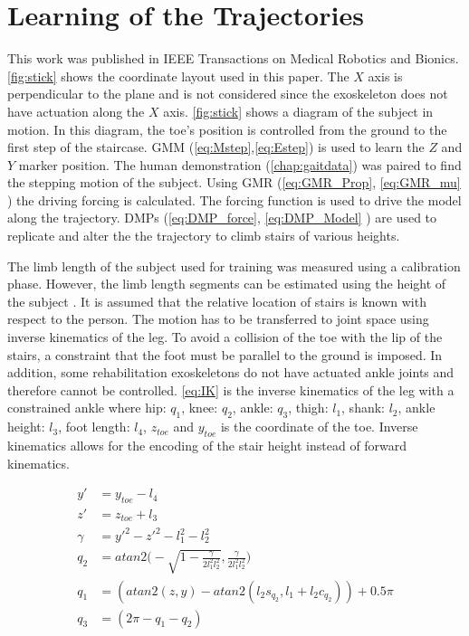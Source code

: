 \section{Learning of the Trajectories}
This work was published in IEEE Transactions on Medical Robotics and Bionics\cite{goldfarb2021towards}. \autoref{fig:stick} shows the coordinate layout used in this paper. The $X$ axis is perpendicular to the plane and is not considered since the exoskeleton does not have actuation along the $X$ axis. \autoref{fig:stick} shows a diagram of the subject in motion. In this diagram, the toe's position is controlled from the ground to the first step of the staircase. GMM (\autoref{eq:Mstep},\autoref{eq:Estep}) is used to learn the $Z$ and $Y$ marker position. The human demonstration (\autoref{chap:gaitdata}) was paired to find the stepping motion of the subject. Using GMR (\autoref{eq:GMR_Prop}, \autoref{eq:GMR_mu} ) the driving forcing is calculated. The forcing function is used to drive the model along the trajectory. DMPs (\autoref{eq:DMP_force}, \autoref{eq:DMP_Model} ) are used to replicate and alter the the trajectory to climb stairs of various heights.  


The limb length of the subject used for training was measured using a calibration phase. However, the limb length segments can be estimated using the height of the subject \cite{anthropomorphic}. It is assumed that the relative location of stairs is known with respect to the person. The motion has to be transferred to joint space using inverse kinematics of the leg. To avoid a collision of the toe with the lip of the stairs, a constraint that the foot must be parallel to the ground is imposed. In addition, some rehabilitation exoskeletons do not have actuated ankle joints and therefore cannot be controlled.  \autoref{eq:IK} is the inverse kinematics of the leg with a constrained ankle where hip: $q_1$, knee: $q_2$, ankle: $q_3$, thigh: $l_1$, shank: $l_2$, ankle height: $l_3$, foot length: $l_4$, $z_{toe}$ and $y_{toe}$ is the coordinate of the toe. Inverse kinematics allows for the encoding of the stair height instead of forward kinematics. 

\begin{equation} 
    \begin{aligned} 
        y' &= y_{toe} - l_4 \\ 
        z' &= z_{toe} + l_3 \\  
        \gamma &= y'^2 - z'^2 - l_1^2  - l_2^2 \\ 
        q_2 &= atan2 \Bigg( -\sqrt{1 - \frac{\gamma }{2 l_1^2 l_2^2}}, \frac{\gamma}{2 l_1^2 l_2^2}\Bigg)\\ 
        q_1 &= (atan2(z, y) - atan2( l_2 s_{q_2}, l_1 + l_2 c_{q_2})) + 0.5\pi \\ 
        q_3 &= (2\pi - q_1 - q_2) 
    \end{aligned} 
    \label{eq:IK} 
\end{equation} 

